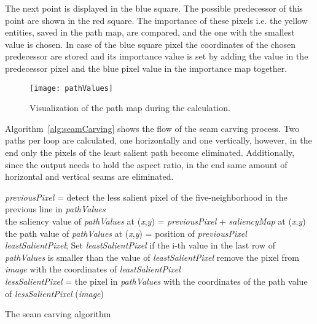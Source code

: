 \documentclass[draft,final]{vutinfth} %
\begin{document}
	The next point is displayed in the blue square.
	The possible predecessor of this point are shown in the red square.
	The importance of these pixels i.e. the yellow entities, saved in the path map, are compared, and the one with the smallest value is chosen.
	In case of the blue square pixel the coordinates of the chosen predecessor are stored and its importance value is set by adding the value in the predecessor pixel and the blue pixel value in the importance map together. 
	\begin{figure}[H]
		\centering		
		\texttt{[image: pathValues]}
		\caption{Visualization of the path map during the calculation.}
		\label{fig:pathValues}
	\end{figure}
	Algorithm~\ref{alg:seamCarving} shows the flow of the seam carving process.
	Two paths per loop are calculated, one horizontally and one vertically, however, in the end only the pixels of the least salient path become eliminated.
	Additionally, since the output needs to hold the aspect ratio, in the end same amount of horizontal and vertical seams are eliminated. \par 
	\begin{algorithm}
		{
			{
				\textit{previousPixel} = detect the less salient pixel of the five-neighborhood in the previous line in \textit{pathValues} \\
				the saliency value of \textit{pathValues} at (\textit{x},\textit{y}) = \textit{previousPixel} + \textit{saliencyMap} at (\textit{x},\textit{y}) \\
				the path value of \textit{pathValues} at (\textit{x},\textit{y}) = position of  \textit{previousPixel}\\
			}
		}
		\textit{leastSalientPixel};
		{
			Set \textit{leastSalientPixel} if the i-th value in the last row of  \textit{pathValues} is smaller than the value of \textit{leastSalientPixel}
		}
		{
			remove the pixel from \textit{image} with the coordinates of \textit{leastSalientPixel}\\
			\textit{lessSalientPixel} = the pixel in \textit{pathValues} with the coordinates of the path value of \textit{lessSalientPixel}
		}
		\Return(\textit{image})
		\caption{The seam carving algorithm}
		\label{alg:seamCarving}
	\end{algorithm}
	
\end{document}
